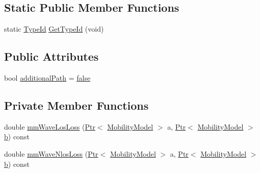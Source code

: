 \subsection*{Static Public Member Functions}
\begin{DoxyCompactItemize}
\item 
static \hyperlink{classns3_1_1TypeId}{Type\+Id} \hyperlink{classns3_1_1BuildingsObstaclePropagationLossModel_a245bf2639ee2d9c83b484456845c2e56}{Get\+Type\+Id} (void)
\end{DoxyCompactItemize}
\subsection*{Public Attributes}
\begin{DoxyCompactItemize}
\item 
bool \hyperlink{classns3_1_1BuildingsObstaclePropagationLossModel_a55cf5d4046b5c71824e4532611a56d78}{additional\+Path} = \hyperlink{lte__cqi__generation_8m_ab1bef239d413c4da139c4bac92cd657a}{false}
\end{DoxyCompactItemize}
\subsection*{Private Member Functions}
\begin{DoxyCompactItemize}
\item 
double \hyperlink{classns3_1_1BuildingsObstaclePropagationLossModel_ad689fe28aa4e050953598741fa1a627c}{mm\+Wave\+Los\+Loss} (\hyperlink{classns3_1_1Ptr}{Ptr}$<$ \hyperlink{classns3_1_1MobilityModel}{Mobility\+Model} $>$ a, \hyperlink{classns3_1_1Ptr}{Ptr}$<$ \hyperlink{classns3_1_1MobilityModel}{Mobility\+Model} $>$ \hyperlink{lte__pathloss_8m_a21ad0bd836b90d08f4cf640b4c298e7c}{b}) const 
\item 
double \hyperlink{classns3_1_1BuildingsObstaclePropagationLossModel_a165f29adb5af1840a7cbb837dcd8e5c9}{mm\+Wave\+Nlos\+Loss} (\hyperlink{classns3_1_1Ptr}{Ptr}$<$ \hyperlink{classns3_1_1MobilityModel}{Mobility\+Model} $>$ a, \hyperlink{classns3_1_1Ptr}{Ptr}$<$ \hyperlink{classns3_1_1MobilityModel}{Mobility\+Model} $>$ \hyperlink{lte__pathloss_8m_a21ad0bd836b90d08f4cf640b4c298e7c}{b}) const 
\end{DoxyCompactItemize}
